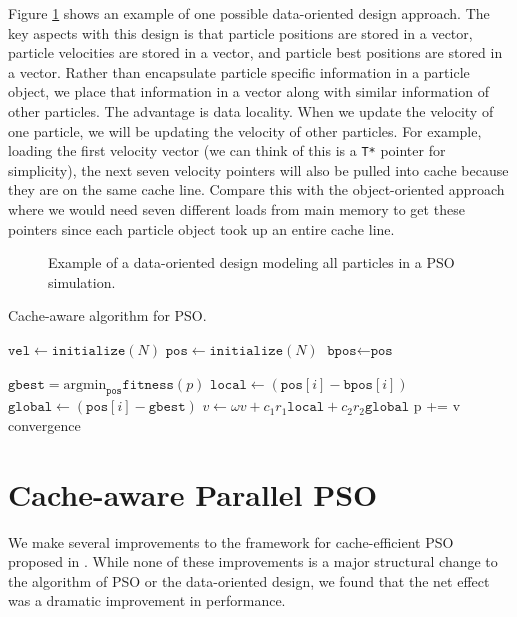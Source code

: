 Figure \ref{fig:particles} shows an example of one possible data-oriented design
approach. The key aspects with this design is that particle positions are stored
in a vector, particle velocities are stored in a vector, and particle best
positions are stored in a vector. Rather than encapsulate particle specific
information in a particle object, we place that information in a vector along
with similar information of other particles. The advantage is data
locality. When we update the velocity of one particle, we will be updating the
velocity of other particles. For example, loading the first velocity vector (we
can think of this is a \texttt{T*} pointer for simplicity), the next seven
velocity pointers will also be pulled into cache because they are on the same
cache line. Compare this with the object-oriented approach where we would need
seven different loads from main memory to get these pointers since each particle
object took up an entire cache line.
\begin{figure}
  
  \caption{Example of a data-oriented design modeling all particles in a PSO
    simulation.}\label{fig:particles}
\end{figure}

\begin{algorithm}
  \caption{Cache-aware algorithm for PSO.}\label{alg:pso-cache}
  \begin{algorithmic}[1]
    \State $\texttt{vel} \gets \texttt{initialize}(N)$ 
    \State $\texttt{pos} \gets \texttt{initialize}(N)$ 
    \State $\texttt{bpos} \gets \texttt{pos}$ 

    \Repeat
    \State $\texttt{gbest} = \text{argmin}_{\texttt{pos}}\texttt{fitness}(p)$
    \State $\texttt{local} \gets (\texttt{pos}[i] -
    \texttt{bpos}[i])$
    \State $\texttt{global} \gets  (\texttt{pos}[i]
    - \texttt{gbest})$
    \State $v \gets \omega v + c_1 r_1 \texttt{local}  + c_2 r_2 \texttt{global}$
    \EndFor
    \State p += v
    \EndFor
    \Until convergence
    \EndProcedure
  \end{algorithmic}
\end{algorithm}

\section{Cache-aware Parallel PSO}\label{sec:algo}
We make several improvements to the framework for cache-efficient PSO proposed
in \cite{cache-pso}. While none of these improvements is a major structural
change to the algorithm of PSO or the data-oriented design, we found that the
net effect was a dramatic improvement in performance.

